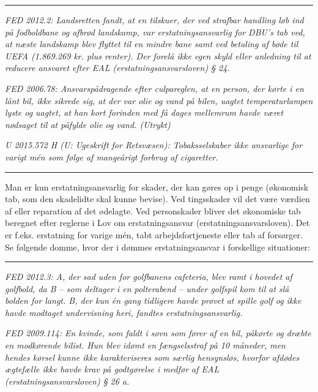 \documentclass[]{book}
\begin{document}
\begin{center}\rule{0.5\linewidth}{\linethickness}\end{center}

\emph{FED 2012.2: Landsretten fandt, at en tilskuer, der ved strafbar handling løb ind på fodboldbane og afbrød landskamp, var erstatningsansvarlig for DBU's tab ved, at næste landskamp blev flyttet til en mindre bane samt ved betaling af bøde til UEFA (1.869.269 kr. plus renter). Der forelå ikke egen skyld eller anledning til at reducere ansvaret efter EAL (erstatningsansvarsloven) § 24.}

\emph{FED 2006.78: Ansvarspådragende efter culpareglen, at en person, der kørte i en lånt bil, ikke sikrede sig, at der var olie og vand på bilen, uagtet temperaturlampen lyste og uagtet, at han kort forinden med få dages mellemrum havde været nødsaget til at påfylde olie og vand. (Utrykt)}

\emph{U 2015.572 H (U: Ugeskrift for Retsvæsen): Tobaksselskaber ikke ansvarlige for varigt mén som følge af mangeårigt forbrug af cigaretter.}

\begin{center}\rule{0.5\linewidth}{\linethickness}\end{center}

Man er kun erstatningsansvarlig for skader, der kan gøres op i penge (økonomisk tab, som den skadelidte skal kunne bevise). Ved tingsskader vil det være værdien af eller reparation af det ødelagte. Ved personskader bliver det økonomiske tab beregnet efter reglerne i Lov om erstatningsansvar (erstatningsansvarsloven). Det er f.eks. erstatning for varige mén, tabt arbejdsfortjeneste eller tab af forsørger. Se følgende domme, hvor der i dømmes erstatningsansvar i forskellige situationer:

\begin{center}\rule{0.5\linewidth}{\linethickness}\end{center}

\emph{FED 2012.3: A, der sad uden for golfbanens cafeteria, blev ramt i hovedet af golfbold, da B -- som deltager i en polterabend -- under golfspil kom til at slå bolden for langt. B, der kun én gang tidligere havde prøvet at spille golf og ikke havde modtaget undervisning heri, fandtes erstatningsansvarlig.}

\emph{FED 2009.114: En kvinde, som faldt i søvn som fører af en bil, påkørte og dræbte en modkørende bilist. Hun blev idømt en fængselsstraf på 10 måneder, men hendes kørsel kunne ikke karakteriseres som særlig hensynsløs, hvorfor afdødes ægtefælle ikke havde krav på godtgørelse i medfør af EAL (erstatningsansvarsloven) § 26 a.}
\end{document}
